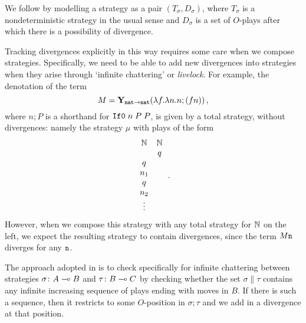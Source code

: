 \documentclass[sigplan,10pt,review]{acmart}\settopmatter{printfolios=true,printccs=false,printacmref=false}
\begin{document}
We follow \cite{mcCHFiniteND} by modelling a strategy as a pair $(T_\sigma,D_\sigma)$, where $T_\sigma$ is a nondeterministic strategy in the usual sense and $D_\sigma$ is a set of $O$-plays after which there is a possibility of divergence.  

Tracking divergences explicitly in this way requires some care when we compose strategies.  
Specifically, we need to be able to add new divergences into strategies when they arise through `infinite chattering' or \emph{livelock}.  
For example, the denotation of the term
\[
  M = \mathbf{Y}_{{\mathtt{nat}}\to{\mathtt{nat}}}(\lambda f.\lambda n.n;(f n))\,,
  \]
where $n;P$ is a shorthand for ${\mathtt{If0}\;} n\;P\;P$, is given by a total strategy, without divergences: namely the strategy $\mu$ with plays of the form
\[
  \begin{array}{cc}
    \mathbf{\mathbb{N}} & \mathbf{\mathbb{N}} \\
    & q \\
    q & \\
    n_1 & \\
    q & \\
    n_2 & \\
    \vdots &
  \end{array}\,.
  \]
However, when we compose this strategy with any total strategy for $\mathbb{N}$ on the left, we expect the resulting strategy to contain divergences, since the term $M {\mathtt{n}}$ diverges for any ${\mathtt{n}}$.

The approach adopted in \cite{mcCHFiniteND} is to check specifically for infinite chattering between strategies $\sigma\colon A\multimap B$ and $\tau\colon B\multimap C$ by checking whether the set $\sigma\|\tau$ contains any infinite increasing sequence of plays ending with moves in $B$.  
If there is such a sequence, then it restricts to some $O$-position in $\sigma;\tau$ and we add in a divergence at that position.  
\end{document}
